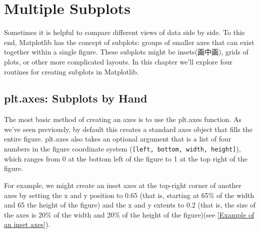 \chapter{Multiple Subplots\label{Ch31}}
Sometimes it is helpful to compare different views of data side by side. To this end,
Matplotlib has the concept of subplots: groups of smaller axes that can exist together
within a single figure. These subplots might be insets(画中画), grids of plots, or other more
complicated layouts. In this chapter we'll explore four routines for creating subplots
in Matplotlib.
\section{plt.axes: Subplots by Hand}
The most basic method of creating an axes is to use the plt.axes function. As we've
seen previously, by default this creates a standard axes object that fills the entire figure. plt.axes also takes an optional argument that is a list of four numbers in the
figure coordinate system (\verb|[left, bottom, width, height]|), which ranges from 0 at
the bottom left of the figure to 1 at the top right of the figure.

For example, we might create an inset axes at the top-right corner of another axes by
setting the x and y position to 0.65 (that is, starting at 65\% of the width and 65%
the height of the figure) and the x and y extents to 0.2 (that is, the size of the axes is
20\% of the width and 20\% of the height of the figure)(see \autoref{Example of an inset axes}).

